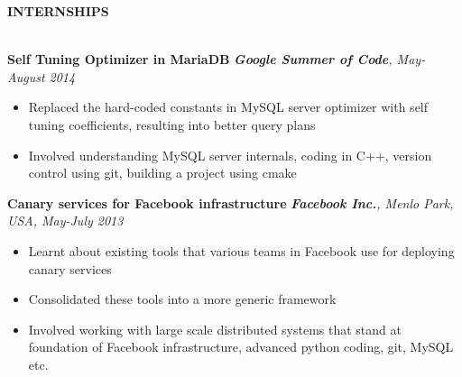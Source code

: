 \documentclass[10pt]{article}
\newcommand{\cvsectiontitle}[1]{
    		\colorbox{gray!40}{%
        \begin{minipage}{0.989\linewidth}%
            \vspace*{1pt}%
            \large\indent\textbf{#1}
            \vspace*{1pt}%
        \end{minipage}%
   		}\\[1mm]
		}
\begin{document}
\cvsectiontitle{INTERNSHIPS}
\textbf{Self Tuning Optimizer in MariaDB} \hfill \textit{\textbf{Google Summer of Code}, May-August 2014} \\
\vspace{-0.6cm}
\begin{itemize}
\setlength{\itemsep}{0.1mm}
	\item Replaced the hard-coded constants in MySQL server optimizer with self tuning coefficients, resulting into better query plans
	\item Involved understanding MySQL server internals, coding in C++, version control using git, building a project using cmake
\end{itemize}
\textbf{Canary services for Facebook infrastructure} \hfill \textit{\textbf{Facebook Inc.}, Menlo Park, USA, May-July 2013} \\
\vspace{-0.6cm}
\begin{itemize}
\setlength{\itemsep}{0.1mm}
	\item Learnt about existing tools that various teams in Facebook use for deploying canary services
	\item Consolidated these tools into a more generic framework
	\item Involved working with large scale distributed systems that stand at foundation of Facebook infrastructure, advanced python coding, git, MySQL etc.
\end{itemize}
\end{document}
